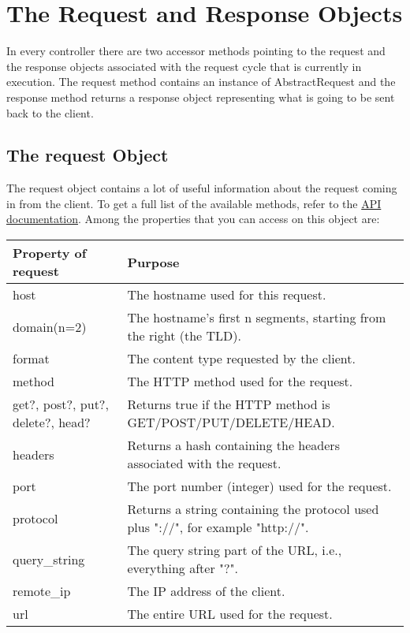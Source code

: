 \documentclass[10pt]{book}
\begin{document}
\section{ The Request and Response Objects}

In every controller there are two accessor methods pointing to the  request and the response objects associated with the request cycle that  is currently in execution. The request method contains an instance of AbstractRequest and the response method returns a response object representing what is going to be sent back to the client.

\subsection{ The request Object}

The request object contains a lot of useful information about the  request coming in from the client. To get a full list of the available  methods, refer to the \href{http://api.rubyonrails.org/classes/ActionDispatch/Request.html}{API documentation}. Among the properties that you can access on this object are:
\\

\noindent
\begin{tabular}{p{}|p{}}
\hline
\textbf{Property of request} & \textbf{Purpose} \\ 
\hline
host & The hostname used for this request. \\ 
domain(n=2) & The hostname’s first n segments, starting from the right (the TLD). \\ 
format & The content type requested by the client. \\ 
method & The HTTP method used for the request. \\ 
get?, post?, put?, delete?, head? & Returns true if the HTTP method is GET/POST/PUT/DELETE/HEAD. \\ 
headers & Returns a hash containing the headers associated with the request. \\ 
port & The port number (integer) used for the request. \\ 
protocol & Returns a string containing the protocol used plus "://", for example "http://". \\ 
query\_string & The query string part of the URL, i.e., everything after "?". \\ 
remote\_ip & The IP address of the client. \\ 
url & The entire URL used for the request.
\end{tabular}
\end{document}
